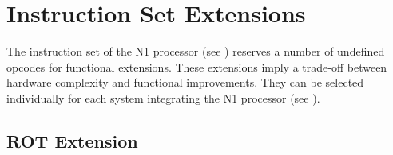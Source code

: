
\section{Instruction Set Extensions}
\label{extensions}

The instruction set of the N1 processor (see ) reserves a number
of undefined \glspl{opcode} for functional extensions.
These extensions imply a trade-off between hardware complexity and functional 
improvements.
They can be selected individually for each system integrating the N1 processor
(see ).    

\subsection{ROT Extension}
\label{extensions:rot}

